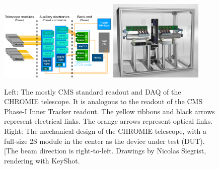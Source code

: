 \documentclass[a4paper,11pt]{article}
\begin{document}
\begin{figure}[htbp]
	\centering %
	\includegraphics[width=0.5\textwidth,origin=c,angle=0]{E2D5Av.png}
	\qquad
	\includegraphics[width=0.4\textwidth,origin=c,angle=0]{Modified1.png}
	\caption{\label{fig:1} Left: The mostly CMS standard readout and DAQ of the CHROMIE telescope. It is analogous to the readout of the CMS Phase-I Inner Tracker readout. The yellow ribbons and black arrows represent electrical links. The orange arrows represent optical links. Right: The mechanical design of the CHROMIE telescope, with a full-size 2S module in the center as the device under test (DUT). [The beam direction is right-to-left. Drawings by Nicolas Siegrist, rendering with KeyShot.}
\end{figure}

\end{document}

